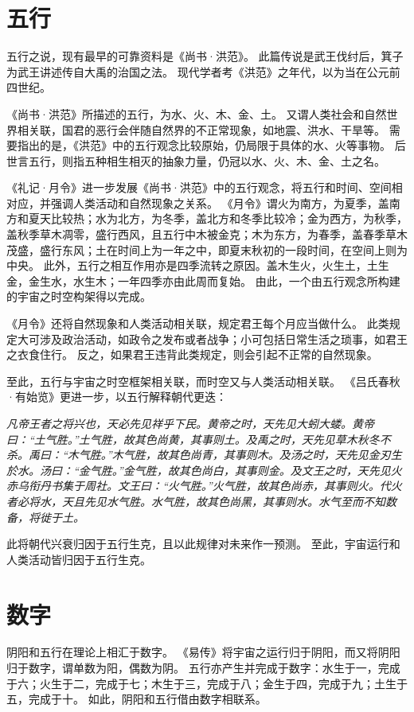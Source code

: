 \documentclass[11pt]{article}
\begin{document}
\section{五行}
五行之说，现有最早的可靠资料是《尚书·洪范》。
此篇传说是武王伐纣后，箕子为武王讲述传自大禹的治国之法。
现代学者考《洪范》之年代，以为当在公元前四世纪。

\newline

《尚书·洪范》所描述的五行，为水、火、木、金、土。
又谓人类社会和自然世界相关联，国君的恶行会伴随自然界的不正常现象，如地震、洪水、干旱等。
需要指出的是，《洪范》中的五行观念比较原始，仍局限于具体的水、火等事物。
后世言五行，则指五种相生相灭的抽象力量，仍冠以水、火、木、金、土之名。

\newline

《礼记·月令》进一步发展《尚书·洪范》中的五行观念，将五行和时间、空间相对应，并强调人类活动和自然现象之关系。
《月令》谓火为南方，为夏季，盖南方和夏天比较热；水为北方，为冬季，盖北方和冬季比较冷；金为西方，为秋季，盖秋季草木凋零，盛行西风，且五行中木被金克；木为东方，为春季，盖春季草木茂盛，盛行东风；土在时间上为一年之中，即夏末秋初的一段时间，在空间上则为中央。
此外，五行之相互作用亦是四季流转之原因。盖木生火，火生土，土生金，金生水，水生木；一年四季亦由此周而复始。
由此，一个由五行观念所构建的宇宙之时空构架得以完成。

\newline
《月令》还将自然现象和人类活动相关联，规定君王每个月应当做什么。
此类规定大可涉及政治活动，如政令之发布或者战争；小可包括日常生活之琐事，如君王之衣食住行。
反之，如果君王违背此类规定，则会引起不正常的自然现象。

\newline

至此，五行与宇宙之时空框架相关联，而时空又与人类活动相关联。
《吕氏春秋·有始览》更进一步，以五行解释朝代更迭：
  
\textit{凡帝王者之将兴也，天必先见祥乎下民。黄帝之时，天先见大蚓大蝼。黄帝曰：“土气胜。”土气胜，故其色尚黄，其事则土。及禹之时，天先见草木秋冬不杀。禹曰：“木气胜。”木气胜，故其色尚青，其事则木。及汤之时，天先见金刃生於水。汤曰：“金气胜。”金气胜，故其色尚白，其事则金。及文王之时，天先见火赤乌衔丹书集于周社。文王曰：“火气胜。”火气胜，故其色尚赤，其事则火。代火者必将水，天且先见水气胜。水气胜，故其色尚黑，其事则水。水气至而不知数备，将徙于土。}

此将朝代兴衰归因于五行生克，且以此规律对未来作一预测。
至此，宇宙运行和人类活动皆归因于五行生克。
  
\section{数字}
阴阳和五行在理论上相汇于数字。
《易传》将宇宙之运行归于阴阳，而又将阴阳归于数字，谓单数为阳，偶数为阴。
五行亦产生并完成于数字：水生于一，完成于六；火生于二，完成于七；木生于三，完成于八；金生于四，完成于九；土生于五，完成于十。
如此，阴阳和五行借由数字相联系。
  
\end{document}
